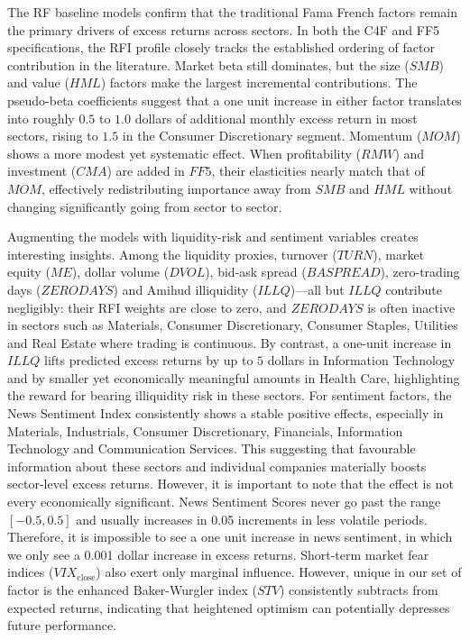 The RF baseline models confirm that the traditional Fama French factors remain the primary drivers of excess returns across sectors. In both the C4F and FF5 specifications, the RFI profile closely tracks the established ordering of factor contribution in the literature.  Market beta still dominates, but the size ($SMB$) and value ($HML$) factors make the largest incremental contributions. The pseudo-beta coefficients suggest that a one unit increase in either factor translates into roughly $0.5$ to $1.0$ dollars of additional monthly excess return in most sectors, rising to $1.5$ in the Consumer Discretionary segment. Momentum ($MOM$) shows a more modest yet systematic effect. When profitability ($RMW$) and investment ($CMA$) are added in $FF5$, their elasticities nearly match that of $MOM$, effectively redistributing importance away from $SMB$ and $HML$ without changing significantly going from sector to sector.

Augmenting the models with liquidity-risk and sentiment variables creates interesting insights. Among the liquidity proxies, turnover ($TURN$), market equity ($ME$), dollar volume ($DVOL$), bid-ask spread ($BASPREAD$), zero-trading days ($ZERODAYS$) and Amihud illiquidity ($ILLQ$)—all but $ILLQ$ contribute negligibly: their RFI weights are close to zero, and $ZERODAYS$ is often inactive in sectors such as Materials, Consumer Discretionary, Consumer Staples, Utilities and Real Estate where trading is continuous. By contrast, a one-unit increase in $ILLQ$ lifts predicted excess returns by up to $5$ dollars in Information Technology and by smaller yet economically meaningful amounts in Health Care, highlighting the reward for bearing illiquidity risk in these sectors. For sentiment factors, the News Sentiment Index consistently shows a stable positive effects, especially in Materials, Industrials, Consumer Discretionary, Financials, Information Technology and Communication Services. This suggesting that favourable information about these sectors and individual companies materially boosts sector-level excess returns. However, it is important to note that the effect is not every economically significant. News Sentiment Scores never go past the range $[-0.5, 0.5]$ and usually increases in 0.05 increments in less volatile periods. Therefore, it is impossible to see a one unit increase in news sentiment, in which we only see a 0.001 dollar increase in excess returns. Short-term market fear indices ($VIX_{\text{close}}$) also exert only marginal influence. However, unique in our set of factor is the  enhanced Baker-Wurgler index ($STV$) consistently subtracts from expected returns, indicating that heightened optimism can potentially depresses future performance. 



